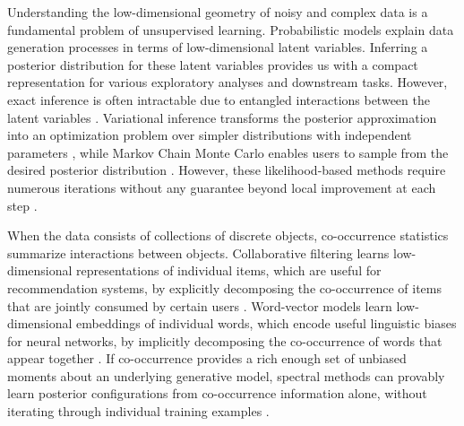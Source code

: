 Understanding the low\hyp{}dimensional geometry of noisy and complex data is a
fundamental problem of unsupervised learning. Probabilistic models explain data
generation processes in terms of low\hyp{}dimensional latent variables. 
Inferring a posterior distribution for these latent variables provides us with a
compact representation for various exploratory analyses and downstream tasks.
However, exact inference is often intractable due to entangled interactions
between the latent variables \cite{LDA,airoldi2008mixed,erosheva2003bayesian,
pritchard2000inference}. Variational inference transforms the posterior
approximation into an optimization problem over simpler distributions with
independent parameters \cite{JGJS,WJ,blei2017variational}, while Markov Chain
Monte Carlo enables users to sample from the desired posterior distribution 
\cite{neal1993probabilistic,neal2011mcmc,robert2013monte}. However, these
likelihood-based methods require numerous iterations without any guarantee
beyond local improvement at each step \cite{kulesza2014low}.

When the data consists of collections of discrete objects, co\hyp{}occurrence
statistics summarize interactions between objects. Collaborative filtering
learns low\hyp{}dimensional representations of individual items, which are
useful for recommendation systems, by explicitly decomposing the 
co\hyp{}occurrence of items that are jointly consumed by certain users 
\cite{moontae2015nips,liang2016factorization}. Word\hyp{}vector models learn 
low\hyp{}dimensional embeddings of individual words, which encode useful
linguistic biases for neural networks, by implicitly decomposing the 
co\hyp{}occurrence of words that appear together 
\cite{pennington2014glove,levy2014neural}. If co\hyp{}occurrence provides a rich
enough set of unbiased moments about an underlying generative model, spectral
methods can provably learn posterior configurations from co\hyp{}occurrence
information alone, without iterating through individual training examples 
\cite{arora2013practical,anandkumar2012method,hsu2012spectral,AHK}.

